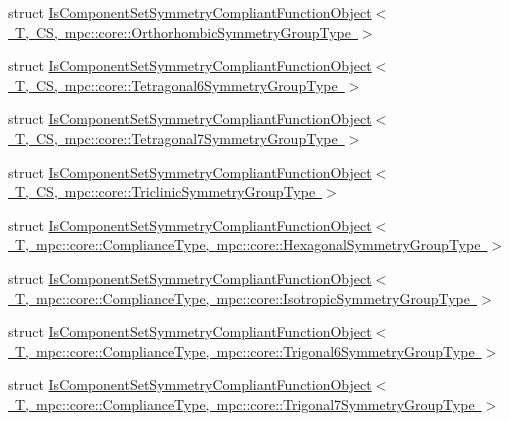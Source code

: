 \begin{DoxyCompactItemize}
\item 
struct \mbox{\hyperlink{structmpc_1_1core_1_1_is_component_set_symmetry_compliant_function_object_3_01_t_00_01_c_s_00_01c77cfd51bf8948d72cf3d00fb984e8d4}{Is\+Component\+Set\+Symmetry\+Compliant\+Function\+Object$<$ T, C\+S, mpc\+::core\+::\+Orthorhombic\+Symmetry\+Group\+Type $>$}}
\item 
struct \mbox{\hyperlink{structmpc_1_1core_1_1_is_component_set_symmetry_compliant_function_object_3_01_t_00_01_c_s_00_01d026bbfe93e923dfb312d1f5251cf8bf}{Is\+Component\+Set\+Symmetry\+Compliant\+Function\+Object$<$ T, C\+S, mpc\+::core\+::\+Tetragonal6\+Symmetry\+Group\+Type $>$}}
\item 
struct \mbox{\hyperlink{structmpc_1_1core_1_1_is_component_set_symmetry_compliant_function_object_3_01_t_00_01_c_s_00_0174e7091832b554a08a6a609e34a1f0c5}{Is\+Component\+Set\+Symmetry\+Compliant\+Function\+Object$<$ T, C\+S, mpc\+::core\+::\+Tetragonal7\+Symmetry\+Group\+Type $>$}}
\item 
struct \mbox{\hyperlink{structmpc_1_1core_1_1_is_component_set_symmetry_compliant_function_object_3_01_t_00_01_c_s_00_01d3c1d925f2eca11cbddbc5600942f490}{Is\+Component\+Set\+Symmetry\+Compliant\+Function\+Object$<$ T, C\+S, mpc\+::core\+::\+Triclinic\+Symmetry\+Group\+Type $>$}}
\item 
struct \mbox{\hyperlink{structmpc_1_1core_1_1_is_component_set_symmetry_compliant_function_object_3_01_t_00_01mpc_1_1cor65f9bfc7ad47a96a53fdb8a3ba7c1868}{Is\+Component\+Set\+Symmetry\+Compliant\+Function\+Object$<$ T, mpc\+::core\+::\+Compliance\+Type, mpc\+::core\+::\+Hexagonal\+Symmetry\+Group\+Type $>$}}
\item 
struct \mbox{\hyperlink{structmpc_1_1core_1_1_is_component_set_symmetry_compliant_function_object_3_01_t_00_01mpc_1_1cor908b0f4089077088ed6aeed533d1b3c9}{Is\+Component\+Set\+Symmetry\+Compliant\+Function\+Object$<$ T, mpc\+::core\+::\+Compliance\+Type, mpc\+::core\+::\+Isotropic\+Symmetry\+Group\+Type $>$}}
\item 
struct \mbox{\hyperlink{structmpc_1_1core_1_1_is_component_set_symmetry_compliant_function_object_3_01_t_00_01mpc_1_1cor7e9d925cc161002e187fa51051b32e07}{Is\+Component\+Set\+Symmetry\+Compliant\+Function\+Object$<$ T, mpc\+::core\+::\+Compliance\+Type, mpc\+::core\+::\+Trigonal6\+Symmetry\+Group\+Type $>$}}
\item 
struct \mbox{\hyperlink{structmpc_1_1core_1_1_is_component_set_symmetry_compliant_function_object_3_01_t_00_01mpc_1_1corf68b74e952b553f9b8078bf1720fcdd4}{Is\+Component\+Set\+Symmetry\+Compliant\+Function\+Object$<$ T, mpc\+::core\+::\+Compliance\+Type, mpc\+::core\+::\+Trigonal7\+Symmetry\+Group\+Type $>$}}

\end{DoxyCompactItemize}
